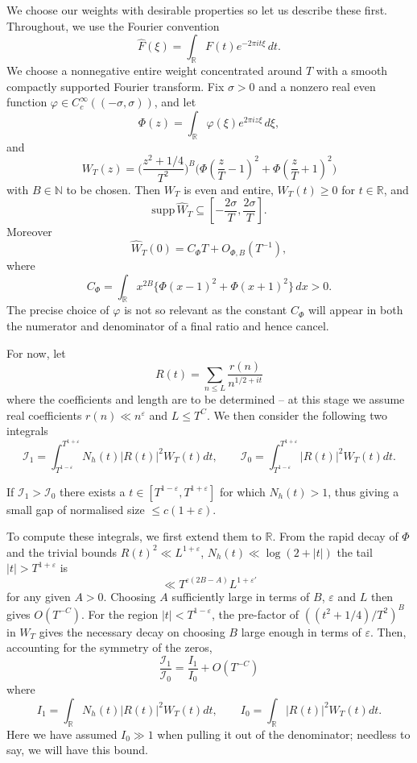 \documentclass[12pt, oneside]{amsart}
\theoremstyle{definition}
\newcommand{\mb}{\mathbb}
\newcommand{\mc}{\mathcal}
\newcommand{\leqs}{\leqslant }
\newcommand{\geqs}{\geqslant }
\newcommand{\wh}{\widehat}
\newcommand{\eps}{\varepsilon}
\newcommand{\1}{\mathds{1}}
\begin{document}
We choose our weights with desirable properties so let us describe these first. Throughout, we use the Fourier convention
\[
 \wh F(\xi)=\int_{\mb{R}}F(t)e^{-2\pi i t\xi}\,dt.
\]
We choose a nonnegative entire weight concentrated around $T$ with a smooth compactly supported Fourier
transform.  Fix $\sigma>0$ and a nonzero real even function
$\varphi\in C_c^\infty((-\sigma,\sigma))$, and let
\[
 \Phi(z)=\int_{\mb{R}}\varphi(\xi)e^{2\pi i z\xi}\,d\xi,
 \]
 and
\begin{equation} \label{eq:entire-weight}
 W_T(z)=\bigg(\frac{z^2+1/4}{T^2}\bigg)^B
 \bigg(\Phi\!\left(\frac zT-1\right)^2
       +\Phi\!\left(\frac zT+1\right)^2\bigg)
\end{equation}
with $B\in\mb{N}$  to be chosen. 
Then $W_T$ is even and entire, $W_T(t)\geqs0$ for $t\in\mb{R}$, and
\begin{equation}
 \mathrm{supp}\,\wh W_T\subseteq
 \left[-\frac{2\sigma}{T},\frac{2\sigma}{T}\right].
 \label{eq:weight-support}
\end{equation}
Moreover
\begin{equation}
 \wh W_T(0)=C_\Phi T+O_{\Phi,B}(T^{-1}),
 \label{eq:weight-mass}
\end{equation}
where
\[
 C_\Phi=\int_{\mb{R}}x^{2B}
 \{\Phi(x-1)^2+\Phi(x+1)^2\}\,dx>0.
\]
The precise choice of $\varphi$ is not so relevant as the constant $C_\Phi$ will appear in both the numerator and denominator of a final ratio and hence cancel. 

For now, let
\[
R(t)=\sum_{n\leqs L}\frac{r(n)}{n^{1/2+it}}
\]
where the coefficients and length are to be determined -- at this stage we assume real coefficients $r(n)\ll n^\eps$ and $L\leqs T^C$. We then consider the following two integrals 
\[
\mc{I}_1=\int_{T^{1-\eps}}^{T^{1+\eps}}N_h(t)|R(t)|^2W_T(t)dt,
\qquad
\mc{I}_0=\int_{T^{1-\eps}}^{T^{1+\eps}}|R(t)|^2W_T(t)dt.
\]

\vspace{0.3cm}
 If $\mc{I}_1>\mc{I}_0$ there exists a $t\in[T^{1-\eps},T^{1+\eps}]$ for which $N_h(t)>1$, thus giving a small gap of normalised size $\leqs c(1+\eps)$. 

\vspace{0.3cm}

To compute these integrals, we first extend them to $\mb{R}$. From the rapid decay of $\Phi$ and the trivial bounds $R(t)^2\ll L^{1+\eps}$, $N_h(t)\ll \log (2+|t|)$ the tail $|t|>T^{1+\eps}$ is
\[
\ll T^{\eps (2B-A)}L^{1+\eps'}
\]
for any given $A>0$. Choosing $A$ sufficiently large in terms of $B$, $\eps$ and $L$ then gives $O(T^{-C})$. For the region $|t|<T^{1-\eps}$, the pre-factor of $((t^2+1/4)/T^2)^B$ in $W_T$ gives the necessary decay on choosing $B$ large enough in terms of $\eps$. Then, accounting for the symmetry of the zeros, 
\[
\frac{\mc{I}_1}{\mc{I}_0}=\frac{I_1}{I_0}+O(T^{-C})
\]  
where 
\[
I_1=\int_\mb{R}N_h(t)|R(t)|^2W_T(t)dt,\qquad I_0=\int_\mb{R} |R(t)|^2W_T(t)dt. 
\]
Here we have assumed $I_0\gg 1$ when pulling it out of the denominator; needless to say, we will have this bound.  
\end{document}
